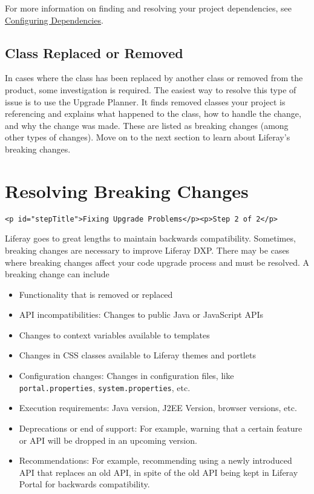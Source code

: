 For more information on finding and resolving your project dependencies,
see
\href{/docs/7-2/customization/-/knowledge_base/c/configuring-dependencies}{Configuring
Dependencies}.

\section{Class Replaced or Removed}\label{class-replaced-or-removed}

In cases where the class has been replaced by another class or removed
from the product, some investigation is required. The easiest way to
resolve this type of issue is to use the Upgrade Planner. It finds
removed classes your project is referencing and explains what happened
to the class, how to handle the change, and why the change was made.
These are listed as breaking changes (among other types of changes).
Move on to the next section to learn about Liferay's breaking changes.

\chapter{Resolving Breaking Changes}\label{resolving-breaking-changes}

\begin{verbatim}
<p id="stepTitle">Fixing Upgrade Problems</p><p>Step 2 of 2</p>
\end{verbatim}

Liferay goes to great lengths to maintain backwards compatibility.
Sometimes, breaking changes are necessary to improve Liferay DXP. There
may be cases where breaking changes affect your code upgrade process and
must be resolved. A breaking change can include

\begin{itemize}
\tightlist
\item
  Functionality that is removed or replaced
\item
  API incompatibilities: Changes to public Java or JavaScript APIs
\item
  Changes to context variables available to templates
\item
  Changes in CSS classes available to Liferay themes and portlets
\item
  Configuration changes: Changes in configuration files, like
  \texttt{portal.properties}, \texttt{system.properties}, etc.
\item
  Execution requirements: Java version, J2EE Version, browser versions,
  etc.
\item
  Deprecations or end of support: For example, warning that a certain
  feature or API will be dropped in an upcoming version.
\item
  Recommendations: For example, recommending using a newly introduced
  API that replaces an old API, in spite of the old API being kept in
  Liferay Portal for backwards compatibility.
\end{itemize}

